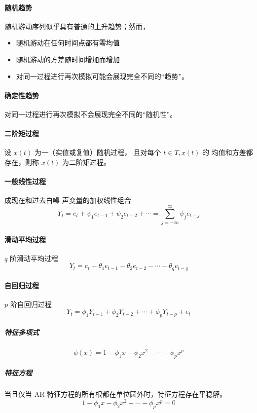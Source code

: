 \documentclass[UTF8,hyperref,a4paper]{ctexart}
\begin{document}
        \paragraph{随机趋势} 随机游动序列似乎具有普通的上升趋势；然而，
        \begin{itemize}
            \item 随机游动在任何时间点都有零均值
            \item 随机游动的方差随时间增加而增加
            \item 对同一过程进行再次模拟可能会展现完全不同的“趋势”。
        \end{itemize}

        \paragraph{确定性趋势} 对同一过程进行再次模拟不会展现完全不同的“随机性”。

        \paragraph{二阶矩过程} 设 $ {x(t)} $ 为一（实值或复值）随机过程，
        且对每个 $  t ∈T, {x(t)}  $ 的 均值和方差都存在，则称 $ {x(t)} $ 为二阶矩过程。

        \paragraph{一般线性过程} 成现在和过去白噪 声变量的加权线性组合
        $$ Y_t = e_t + \psi_1 e_{t-1} + \psi_2 e_{t-2} + \cdots
               = \sum_{j=-\infty}^\infty \psi_j e_{t-j} $$
        
        \paragraph{滑动平均过程}  $ q $ 阶滑动平均过程
        $$ Y_t = e_t - \theta_1 e_{t-1} - \theta_2 e_{t-2} - \cdots - \theta_q e_{t-q} $$

        \paragraph{自回归过程}  $ p $ 阶自回归过程
        $$ Y_t = \phi_1 Y_{t-1} + \phi_2 Y_{t-2} + \cdots + \phi_p Y_{t-p} + e_t $$ 

        \subparagraph{特征多项式} 
        $$ \phi (x) = 1 - \phi_1 x - \phi_2 x^2 - \cdots - \phi_p x^p $$ 

        \subparagraph{特征方程} 当且仅当 AR 特征方程的所有根都在单位圆外时，特征方程存在平稳解。
        $$ 1 - \phi_1 x - \phi_2 x^2 - \cdots - \phi_p x^p = 0 $$
\end{document}

